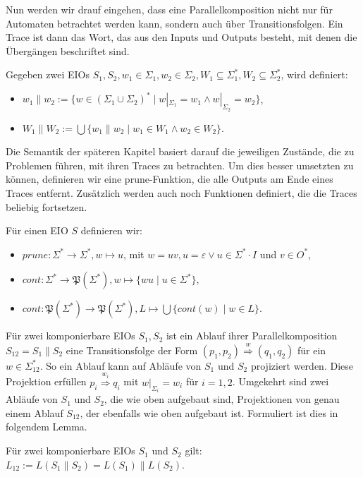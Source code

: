 Nun werden wir drauf eingehen, dass eine Parallelkomposition nicht nur für
Automaten betrachtet werden kann, sondern auch über Transitionsfolgen. Ein
Trace ist dann das Wort, das aus den Inputs und Outputs besteht, mit denen die
Übergängen beschriftet sind.

\begin{Def}
  Gegeben zwei EIOs $S_1, S_2,
  w_1\in\Sigma _1, w_2\in\Sigma _2, W_1\subseteq\Sigma _1^*, W_2\subseteq\Sigma
  _2^*$, wird definiert:
  \begin{itemize}
    \item $w_1\| w_2:=\{w\in (\Sigma _1\cup\Sigma _2)^*\mid w|_{\Sigma _1}=w_1\wedge
      w|_{\Sigma _2}=w_2\}$,
    \item $W_1\| W_2:=\bigcup\{w_1\| w_2\mid w_1\in W_1\wedge w_2\in W_2\}$.
  \end{itemize}
\end{Def}

Die Semantik der späteren Kapitel basiert darauf die jeweiligen Zustände, die
zu Problemen führen, mit ihren Traces zu betrachten. Um dies besser umsetzten zu
können, definieren wir eine prune-Funktion, die alle Outputs am Ende
eines Traces entfernt. Zusätzlich werden auch noch Funktionen definiert, die
die Traces beliebig fortsetzen.

\begin{Def}
  Für einen EIO $S$ definieren wir:
  \begin{itemize}
    \item $prune:\Sigma ^*\rightarrow\Sigma ^*, w\mapsto u$, mit $w=uv,
      u=\varepsilon\vee u\in\Sigma ^*\cdot I$ und $v\in O^*$,
    \item $cont:\Sigma ^*\rightarrow\mathfrak{P}(\Sigma ^*),
      w\mapsto\{wu\mid u\in\Sigma ^*\}$,
    \item $cont:\mathfrak{P}(\Sigma ^*)\rightarrow\mathfrak{P}(\Sigma ^*),
      L\mapsto\bigcup\{cont(w)\mid w\in L\}$.
  \end{itemize}
\end{Def}

Für zwei komponierbare EIOs $S_1, S_2$ ist ein Ablauf ihrer
Parallelkomposition $S_{12}=S_1\| S_2$ eine Transitionsfolge der Form $(p_1,p_2)
\overset{w}{\Rightarrow} (q_1,q_2)$ für ein $w\in\Sigma_{12}^*$. So ein Ablauf
kann auf Abläufe von $S_1$ und $S_2$ projiziert werden. Diese Projektion
erfüllen $p_i \overset{w_i}{\Rightarrow} q_i$ mit $w|_{\Sigma
_i}=w_i$ für $i=1,2$. Umgekehrt sind zwei Abläufe von $S_1$ und $S_2$,
die wie oben aufgebaut sind, Projektionen von genau einem Ablauf
$S_{12}$, der ebenfalls wie oben aufgebaut ist. Formuliert ist dies in
folgendem Lemma.

\begin{lem}
  \label{LemmaSprache}
  Für zwei komponierbare EIOs $S_1$ und $S_2$ gilt: $L_{12} := L(S_1\|S_2) =
  L(S_1)\|L(S_2)$.
\end{lem}
